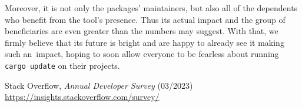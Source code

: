 \documentclass[licencjacka,en]{pracamgr}
\begin{document}
Moreover, it is not only the packages' maintainers, but also all of the dependents who benefit
from the tool's presence. Thus its actual impact and the group of beneficiaries are even greater
than the numbers may suggest. With that, we firmly believe that its future is bright and are happy
to already see it making such an~impact, hoping to soon allow everyone to be fearless about running
\texttt{cargo update} on their projects.


\appendix

\begin{thebibliography}{99}







 Stack Overflow,
	\textit{Annual Developer Survey} (03/2023) \\
	\url{https://insights.stackoverflow.com/survey/}









\end{thebibliography}
\end{document}
